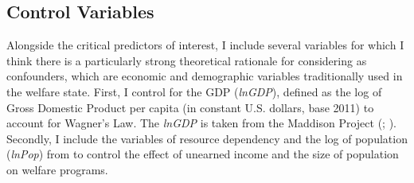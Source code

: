 \documentclass[12pt, letterpage, notitlepage]{article}
\begin{document}


\subsection{Control Variables}

Alongside the critical predictors of interest, I include several variables for which I think there is a particularly strong theoretical rationale for considering as confounders, which are economic and demographic variables traditionally used in the welfare state.  First, I control for the GDP (\textit{lnGDP}), defined as the log of Gross Domestic Product per capita (in constant U.S. dollars, base 2011) to account for Wagner’s Law. The \textit{lnGDP} is taken from the Maddison Project (\citealp{Bolt2014}; \citealp[14]{Rasmussen2019}). Secondly, I include the variables of resource dependency and the log of population (\textit{lnPop}) from \citet{Miller2015a} to control the effect of unearned income and the size of population on welfare programs.

\end{document}
